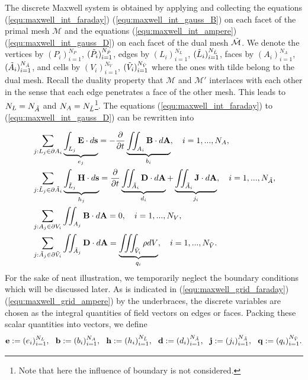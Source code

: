 \documentclass{report}
\begin{document}
The discrete Maxwell system is obtained by applying and collecting the equations (\ref{equ:maxwell_int_faraday}) (\ref{equ:maxwell_int_gauss_B}) on each facet of the primal mesh $\mathcal{M}$ and the equations (\ref{equ:maxwell_int_ampere}) (\ref{equ:maxwell_int_gauss_D}) on each facet of the dual mesh $\Tilde{\mathcal{M}}$. We denote the vertices by $(P_i)_{i=1}^{N_P}$, $(\Tilde{P}_i)_{i=1}^{N_{\Tilde{P}}}$, edges by $(L_i)_{i=1}^{N_L}$, $(\Tilde{L}_i)_{i=1}^{N_{\Tilde{L}}}$, faces by $(A_i)_{i=1}^{N_A}$, $(\Tilde{A}_i)_{i=1}^{N_{\Tilde{A}}}$, and cells by $(V_i)_{i=1}^{N_V}$, $(\Tilde{V}_i)_{i=1}^{N_{\Tilde{V}}}$ where the ones with tilde belong to the dual mesh. Recall the duality property that $\mathcal{M}$ and $\mathcal{M}'$ interlaces with each other in the sense that each edge penetrates a face of the other mesh. This leads to $N_L = N_{\Tilde{A}}$ and $N_A = N_{\Tilde{L}}$\footnote{Note that here the influence of boundary is not considered.}. The equations (\ref{equ:maxwell_int_faraday}) to (\ref{equ:maxwell_int_gauss_D}) can be rewritten into

\begin{align}
    &\sum_{j:L_j\in\partial A_i} \underbrace{\int_{L_j} \mathbf{E} \cdot d\mathbf{s}}_{e_j} = - \frac{\partial}{\partial t} \underbrace{\iint_{A_i} \mathbf{B} \cdot d\mathbf{A}}_{b_i},\ \ \ i = 1,...,N_A, \label{equ:maxwell_grid_faraday} \\
    &\sum_{j:\Tilde{L}_j\in\partial \Tilde{A}_i} \underbrace{\int_{\Tilde{L}_j} \mathbf{H} \cdot d\mathbf{s}}_{h_j} = \frac{\partial}{\partial t} \underbrace{\iint_{\Tilde{A}_i} \mathbf{D} \cdot d\mathbf{A}}_{d_i} + \underbrace{\iint_{\Tilde{A}_i} \mathbf{J} \cdot d\mathbf{A}}_{j_i}, \ \ \ i = 1,...,N_{\Tilde{A}}, \label{equ:maxwell_grid_ampere}\\
    &\sum_{j:A_j\in \partial V_i} \iint_{A_j} \mathbf{B} \cdot d\mathbf{A} = 0,\ \ \ i = 1,..., N_V,\label{equ:maxwell_grid_gauss_B}\\
    &\sum_{j:\Tilde{A}_j \in \partial\Tilde{V}_i}\iint_{\Tilde{A}_j} \mathbf{D} \cdot d\mathbf{A} = \underbrace{\iiint_{\Tilde{V}_i} \rho dV}_{q_i},\ \ \ i = 1,...,N_{\Tilde{V}}. \label{equ:maxwell_grid_gauss_D}
\end{align}
For the sake of neat illustration, we temporarily neglect the boundary conditions which will be discussed later. As is indicated in (\ref{equ:maxwell_grid_faraday})(\ref{equ:maxwell_grid_ampere}) by the underbraces, the discrete variables are chosen as the integral quantities of field vectors on edges or faces. Packing these scalar quantities into vectors, we define
\begin{equation} \label{equ:fit_scale_vector}
    \mathbf{e} := (e_i)_{i=1}^{N_L},\ \ \mathbf{b} := (b_i)_{i=1}^{N_A}, \ \ \mathbf{h} := (h_i)_{i=1}^{N_{\Tilde{L}}}, \ \ \mathbf{d} := (d_i)_{i=1}^{N_{\Tilde{A}}}, \ \ \mathbf{j} := (j_i)_{i=1}^{N_{\Tilde{A}}}, \ \ \mathbf{q} := (q_i)_{i=1}^{N_{\Tilde{V}}}.
\end{equation}
\end{document}
